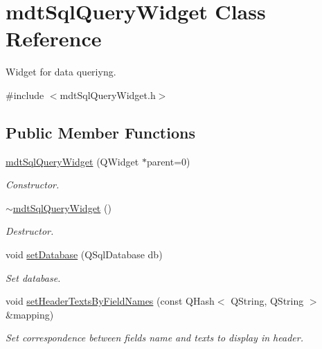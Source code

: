 \hypertarget{classmdt_sql_query_widget}{
\section{mdtSqlQueryWidget Class Reference}
\label{classmdt_sql_query_widget}
}


Widget for data queriyng.  




{\ttfamily \#include $<$mdtSqlQueryWidget.h$>$}

\subsection*{Public Member Functions}
\begin{DoxyCompactItemize}
\item 
\hypertarget{classmdt_sql_query_widget_a164c6ea31fd4499109c6422f7a8f2bdf}{
\hyperlink{classmdt_sql_query_widget_a164c6ea31fd4499109c6422f7a8f2bdf}{mdtSqlQueryWidget} (QWidget $\ast$parent=0)}
\label{classmdt_sql_query_widget_a164c6ea31fd4499109c6422f7a8f2bdf}

\begin{DoxyCompactList}\small\item\em Constructor. \end{DoxyCompactList}\item 
\hypertarget{classmdt_sql_query_widget_a03a4c8f444655f35d91b1a1b58a13b85}{
\hyperlink{classmdt_sql_query_widget_a03a4c8f444655f35d91b1a1b58a13b85}{$\sim$mdtSqlQueryWidget} ()}
\label{classmdt_sql_query_widget_a03a4c8f444655f35d91b1a1b58a13b85}

\begin{DoxyCompactList}\small\item\em Destructor. \end{DoxyCompactList}\item 
\hypertarget{classmdt_sql_query_widget_a69de231c33149a9f01df0215a91cf0bd}{
void \hyperlink{classmdt_sql_query_widget_a69de231c33149a9f01df0215a91cf0bd}{setDatabase} (QSqlDatabase db)}
\label{classmdt_sql_query_widget_a69de231c33149a9f01df0215a91cf0bd}

\begin{DoxyCompactList}\small\item\em Set database. \end{DoxyCompactList}\item 
void \hyperlink{classmdt_sql_query_widget_a8ca0e1fbf8be78fe178ee1f2fc15522c}{setHeaderTextsByFieldNames} (const QHash$<$ QString, QString $>$ \&mapping)
\begin{DoxyCompactList}\small\item\em Set correspondence between fields name and texts to display in header. \end{DoxyCompactList}\end{DoxyCompactItemize}


